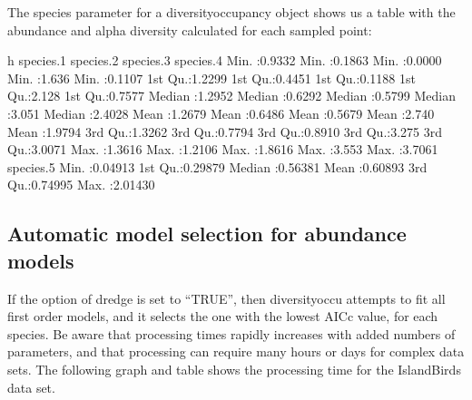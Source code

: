 \documentclass[article]{jss}
\begin{document}
The species parameter for a diversityoccupancy object shows us a table with the abundance and alpha diversity calculated for each sampled point:

\begin{CodeChunk}
\begin{CodeOutput}
       h            species.1        species.2        species.3       species.4     
 Min.   :0.9332   Min.   :0.1863   Min.   :0.0000   Min.   :1.636   Min.   :0.1107  
 1st Qu.:1.2299   1st Qu.:0.4451   1st Qu.:0.1188   1st Qu.:2.128   1st Qu.:0.7577  
 Median :1.2952   Median :0.6292   Median :0.5799   Median :3.051   Median :2.4028  
 Mean   :1.2679   Mean   :0.6486   Mean   :0.5679   Mean   :2.740   Mean   :1.9794  
 3rd Qu.:1.3262   3rd Qu.:0.7794   3rd Qu.:0.8910   3rd Qu.:3.275   3rd Qu.:3.0071  
 Max.   :1.3616   Max.   :1.2106   Max.   :1.8616   Max.   :3.553   Max.   :3.7061  
   species.5      
 Min.   :0.04913  
 1st Qu.:0.29879  
 Median :0.56381  
 Mean   :0.60893  
 3rd Qu.:0.74995  
 Max.   :2.01430  
\end{CodeOutput}
\end{CodeChunk}

\subsection{Automatic model selection for abundance
models}\label{automatic-model-selection-for-abundance-models}

If the option of dredge is set to ``TRUE'', then diversityoccu attempts
to fit all first order models, and it selects the one with the lowest
AICc value, for each species. Be aware that processing times rapidly
increases with added numbers of parameters, and that processing can
require many hours or days for complex data sets. The following graph
and table shows the processing time for the IslandBirds data set.
\end{document}
